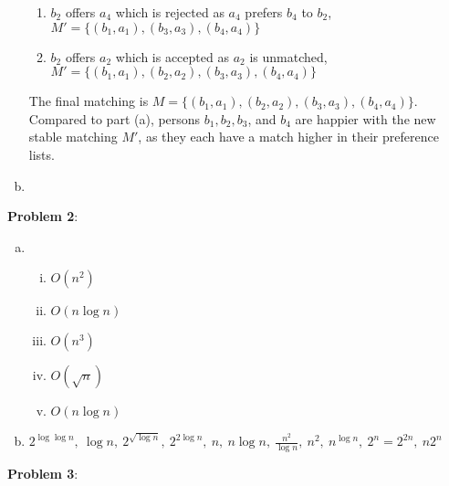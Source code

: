 \documentclass{article}
\begin{document}
\begin{enumerate}[a)]
\begin{enumerate}[1.]
        \item $b_2$ offers $a_4$ which is rejected as $a_4$ prefers $b_4$ to $b_2$, $M' = \{(b_1, a_1), (b_3, a_3), (b_4, a_4)\}$
        \item $b_2$ offers $a_2$ which is accepted as $a_2$ is unmatched, $M' = \{(b_1, a_1), (b_2, a_2), (b_3, a_3), (b_4, a_4)\}$
    \end{enumerate}
    The final matching is $M = \{(b_1, a_1), (b_2, a_2), (b_3, a_3), (b_4, a_4)\}$. Compared to part (a), persons $b_1, b_2, b_3$, and $b_4$ are happier with the new stable matching $M'$, as they each have a match higher in their preference lists. 
    \item
\end{enumerate}
\textbf{Problem 2}:
\begin{enumerate}[a)]
    \item 
    \begin{enumerate}[(i)]
        \item $O(n^2)$
        \item $O(n \log n)$
        \item $O(n^3)$
        \item $O(\sqrt{n})$
        \item $O(n \log n)$
    \end{enumerate}
    \item $2^{\log \log n},\ \log n,\ 2^{\sqrt{\log n}},\ 2^{2 \log n},\ n,\ n \log n,\ \frac{n^2}{\log n},\ n^2,\ n^{\log n},\ 2^n = 2^{2n},\ n2^n$
\end{enumerate}
\textbf{Problem 3}:
\end{document}
